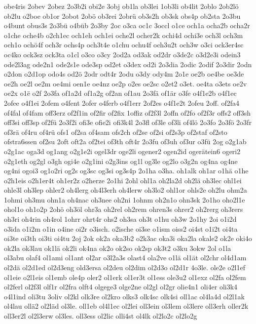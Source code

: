 {obe4ris
2obev
2obez
2o3b2i
obi2e
3obj
ob1la
ob3lei
1ob3li
ob4lit
2oblo
2ob2lö
ob2lu
o2boe
ob1or
2obot
2obö
ob3rei
2obrü
ob3s2h
ob3sk
obs4p
ob2sta
2o3bu
o4bunt
obus3s
2o3bü
o4büb
2o3by
2oc
o3ca
oc1c
3occl
o1ce
och1a
ocha2b
ocha2r
o1che
oche4b
o2ch1ec
och1eh
och1ei
oche2l
ocher2k
ochi4d
ochi3e
och3l
och3m
och1o
ochö4f
och3r
ochs4p
och3t4e
o1chu
ochu4f
och3u2t
och3w
o3ci
ock3er4sc
oc4ko
ock3sz
ock3ta
o1cl
o3co
o3cy
2od2a
od3ak
od2dr
o3de2c
o3d2e3i
odein3
ode2l3ag
ode2n1
ode2s1e
ode3sp
od2et
o3dex
od2i
2o3dia
2odic
2odif
2o3dir
2odn
o2don
o2d1op
odo4s
od2ö
2odr
odt4r
2odu
o3dy
ody4m
2o1e
oe2b
oe4be
oe3de
oe2h
oe2l
oe2m
oe4mi
oen1e
oe4nz
oe2p
o2es
oe2sc
o2et2
o3et.
oe4ta
o3ets
oe2v
oe2x
o1ë
o2f
2o3fa
of1a2d
of1a2g
of2an
of1au
2o3fä
of1är
o3fe
o4f1e2b
o4f1ec
2ofee
o4f1ei
2ofem
o4fent
2ofer
o4ferb
o4f1err
2of2es
o4f1e2t
2ofeu
2off.
of2fa4
of4fal
of4fam
off3erz
of2f1in
of2fir
of2fix
1offiz
of2f3l
2offn
of2fo
of2f3r
offs2
off3sh
off3si
off3sp
of2fü
2o3f2i
ofi3e
ofie2i
ofi3k4l
2o3fl
of3le
of3li
of4lö
2o3fo
2o3fö
2o3fr
of3rä
of4ru
of4rü
ofs1
of2sa
of4sam
ofs2ch
of2se
of2si
of2s3p
of2staf
of2sto
ofstra6ssen
of2su
2oft
oft2a
of2tei
of3th
oft4r
2o3fu
of3uh
of3ur
o3fü
2og
o2g1ab
o2g1ac
oga3d
og1ang
o2g1e2i
ogel3dr
oge2li
ogener2
ogen2id
ogerätein6
ogeri2
o2g1eth
og2gl
o3gh
ogi4e
o2g1ini
o2g3ins
og1l
og3le
og2lo
o3g2n
og4na
og4ne
og4ni
ogoi3
og1o2ri
og2s
og3sc
og3si
og3s4p
2o1ha
o3ha.
oh1alk
oh1ar
o1hä
o1he
o2h1eis
o2h1er4t
oh1er2z
o2herze
2o1hi
2ohl
ohl1a
oh2la2d
oh2lä
oh3lec
ohl1ei
ohle3l
oh3lep
ohler2
oh4lerg
oh4l3erh
oh4lerw
oh3lo2
ohl1or
ohls2e
oh2lu
ohm2a
1ohmi
oh3mu
ohn1a
oh4nac
oh3nee
oh2ni
1ohnm
oh2n1o
ohn3sk
2o1ho
oho2l1e
ohol1o
oh1o2p
2ohö
oh3öl
ohr3a
oh2rel
oh2rem
ohren3s
ohrer2
oh2rerg
oh3rers
oh3ri
oh4rin
oh4rol
1ohrr
ohrt4r
ohs2
oh3sa
oh3t
o1hu
oh3w
2o1hy
2oi
o1i2d
o3ida
o1i2m
o1in
o4ine
oi2r
o3isch.
o2ische
oi3se
o1ism
oiss2
oi4st
o1i2t
oi4ta
oi3te
oi3th
oi3ti
oi4tu
2oj
2ok
ok2a
oka3b2
o2k3ac
oka3i
oka2la
okale2
ok2e
oki4o
ok2la
ok3lau
ok1lä
ok2li
ok4na
ok2o
ok2so
ok2sp
ok3t2
o3ku
3okw
2ol
o1la
ol3abu
olaf4
ol1ami
ol1ant
ol2ar
o3l2a3s
olast4
ola2ve
o1lä
ol1ät
ol2chr
ol4d1am
ol2dä
ol2d1ed
ol2d3eng
old3ersa
ol2deu
ol2dim
ol2d3o
ol2d1r
4o3le.
ole2e
o2l1ef
ol1eie
o2l1eis
ol1emb
ole4p
oler2
ol1erk
ol1er3t
ol1ess
ole3u2
ol1exz
ol2fa
ol2fem
ol2ferl
ol2f3l
olf1r
ol2fra
olft4
olgege3
olge2ne
ol2gl
ol2gr
olie4n1
oli4er
oli3k4
o4l1ind
oli3tu
3oliv
ol2kl
olk3re
ol2kro
olks3
olk4sc
olk4si
oll1ac
ol4la4d
ol2l1ak
ol4lau
ollä2
ol2läd
ol3le.
oll1eb
ol4l1ec
ol2lei
oll3ein
ol3lem
ol3lere
oll3erh
oller2k
oll3er2l
ol2l3erw
ol3les.
oll3ess
ol2lic
olli4st
ol4lk
ol2lo2c
ol2lo2g
}

